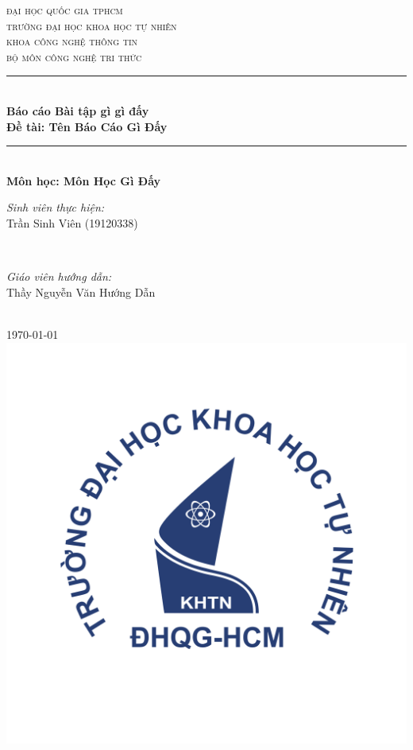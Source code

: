 \documentclass[12pt]{article}
\newcommand{\coursename}{Môn Học Gì Đấy}
\newcommand{\reportname}{Tên Báo Cáo Gì Đấy}
\begin{document}
\begin{titlepage}
\newcommand{\HRule}{\rule{\linewidth}{0.5mm}}
\centering

\textsc{\LARGE đại học quốc gia tphcm}\\[1.5cm]
\textsc{\Large trường đại học khoa học tự nhiên}\\[0.5cm]
\textsc{\large khoa công nghệ thông tin}\\[0.5cm]
\textsc{bộ môn công nghệ tri thức}\\[0.5cm]

\HRule \\[0.4cm]
{ 
\huge{\bfseries{Báo cáo Bài tập gì gì đấy}}\\[0.5cm]
\large{\bfseries{Đề tài: \reportname}}
}\\[0.4cm]
\HRule \\[0.5cm]

\textbf{\large Môn học: \coursename}\\[0.5cm]

\begin{minipage}[t]{0.4\textwidth}
\begin{flushleft} \large
\emph{Sinh viên thực hiện:}\\
Trần Sinh Viên (19120338)
\end{flushleft}
\end{minipage}
~
\begin{minipage}[t]{0.4\textwidth}
\begin{flushright} \large
\emph{Giáo viên hướng dẫn:} \\
Thầy Nguyễn Văn Hướng Dẫn
\end{flushright}
\end{minipage}\\[2cm]

{\large \today}\\[2cm]

\includegraphics[scale=.3]{img/hcmus-logo.png}\\[1cm] 


\end{titlepage}
\end{document}
